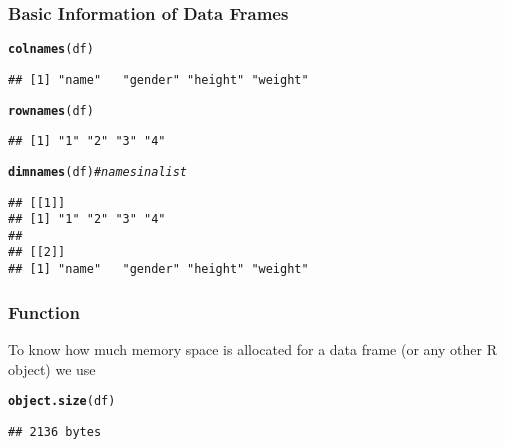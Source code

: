 \documentclass[12pt]{beamer}\usepackage[]{graphicx}\usepackage[]{color}
\makeatletter
\newcommand{\hlcom}[1]{\textcolor[rgb]{0.678,0.584,0.686}{\textit{#1}}}%
\newcommand{\hlstd}[1]{\textcolor[rgb]{0.345,0.345,0.345}{#1}}%
\newcommand{\hlkwd}[1]{\textcolor[rgb]{0.737,0.353,0.396}{\textbf{#1}}}%
\newenvironment{kframe}{%
 \def\at@end@of@kframe{}%
 \ifinner\ifhmode%
  \def\at@end@of@kframe{\end{minipage}}%
  \begin{minipage}{\columnwidth}%
 \fi\fi%
 \def\FrameCommand##1{\hskip\@totalleftmargin \hskip-\fboxsep
 \colorbox{shadecolor}{##1}\hskip-\fboxsep
     \hskip-\linewidth \hskip-\@totalleftmargin \hskip\columnwidth}%
 \MakeFramed {\advance\hsize-\width
   \@totalleftmargin\z@ \linewidth\hsize
   \@setminipage}}%
 {\par\unskip\endMakeFramed%
 \at@end@of@kframe}
\newenvironment{knitrout}{}{} %
\makeatother
\begin{document}

\begin{frame}[fragile]
\frametitle{Basic Information of Data Frames}

\begin{knitrout}\footnotesize
{}\color{fgcolor}\begin{kframe}
\begin{alltt}
\hlkwd{colnames}\hlstd{(df)}
\end{alltt}
\begin{verbatim}
## [1] "name"   "gender" "height" "weight"
\end{verbatim}
\begin{alltt}
\hlkwd{rownames}\hlstd{(df)}
\end{alltt}
\begin{verbatim}
## [1] "1" "2" "3" "4"
\end{verbatim}
\begin{alltt}
\hlkwd{dimnames}\hlstd{(df)} \hlcom{# names in a list}
\end{alltt}
\begin{verbatim}
## [[1]]
## [1] "1" "2" "3" "4"
## 
## [[2]]
## [1] "name"   "gender" "height" "weight"
\end{verbatim}
\end{kframe}
\end{knitrout}

\end{frame}


\begin{frame}[fragile]
\frametitle{Function }

To know how much memory space is allocated for a data frame (or any other R object) we use 
\begin{knitrout}\footnotesize
{}\color{fgcolor}\begin{kframe}
\begin{alltt}
\hlkwd{object.size}\hlstd{(df)}
\end{alltt}
\begin{verbatim}
## 2136 bytes
\end{verbatim}
\end{kframe}
\end{knitrout}

\end{frame}
\end{document}
